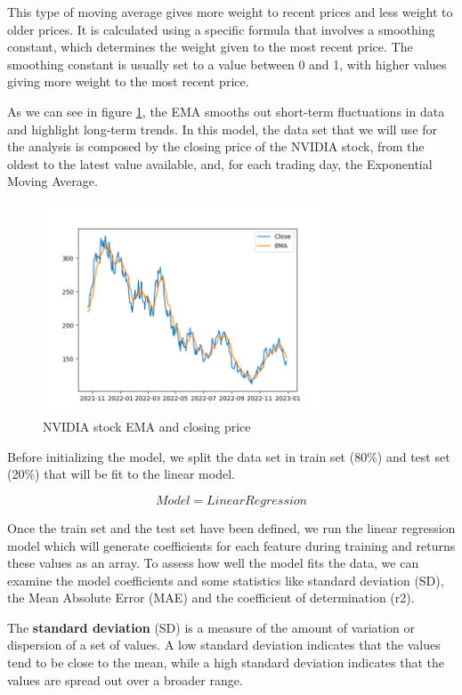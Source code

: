\documentclass[conference,compsoc]{IEEEtran}
\begin{document}
This type of moving average gives more weight to recent prices and less weight to older prices.
%
It is calculated using a specific formula that involves a smoothing constant, which determines the weight given to the most recent price.
%
The smoothing constant is usually set to a value between 0 and 1, with higher values giving more weight to the most recent price.

As we can see in figure \ref{ema}, the EMA smooths out short-term fluctuations in data and highlight long-term trends.
%
In this model, the data set that we will use for the analysis is composed by the closing price of the NVIDIA stock, from the oldest to the latest value available, and, for each trading day, the Exponential Moving Average.

\begin{figure}[ht]
\centering
\includegraphics[width=3.3in]{images/ema.png}
\caption{NVIDIA stock EMA and closing price}
\label{ema}
\end{figure}

Before initializing the model, we split the data set in train set (80\%) and test set (20\%) that will be fit to the linear model.

\[ Model = Linear Regression \]

Once the train set and the test set have been defined, we run the linear regression model which will generate coefficients for each feature during training and returns these values as an array.
%
To assess how well the model fits the data, we can examine the model coefficients and some statistics like standard deviation (SD), the Mean Absolute Error (MAE) and the coefficient of determination (r2).

The \textbf{standard deviation} (SD) is a measure of the amount of variation or dispersion of a set of values.
%
A low standard deviation indicates that the values tend to be close to the mean, while a high standard deviation indicates that the values are spread out over a broader range.
\end{document}
